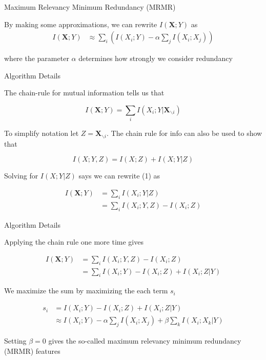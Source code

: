 \documentclass{beamer}					%
\begin{document}
\begin{frame}{Maximum Relevancy Minimum Redundancy (MRMR)}

By making some approximations, we can rewrite $I(\bm{X};Y)$ as
\begin{align*}
I(\bm{X};Y) &\approx \sum_{i} \left(I(X_{i};Y)- \alpha\sum_{j}I(X_{i};X_{j}) \right)
\end{align*}

where the parameter $\alpha$ determines how strongly we consider redundancy

\end{frame}

\begin{frame}{Algorithm Details}

The chain-rule for mutual information tells us that

\begin{equation}
I(\bm{X};Y) = \sum_{i}I(X_{i};Y|\bm{X}_{\backslash i})
\end{equation} 

To simplify notation let $Z = \bm{X}_{\backslash i}$. The chain rule for info can also be used to show that 

\begin{equation*}
I(X;Y,Z) = I(X;Z) + I(X;Y|Z)
\end{equation*}

Solving for $I(X;Y|Z)$ says we can rewrite (1) as

\begin{align*}
I(\bm{X};Y) &= \sum_{i}I(X_{i};Y|Z)\\
&= \sum_{i}I(X_{i};Y,Z) - I(X_{i};Z)
\end{align*} 

\end{frame}

\begin{frame}{Algorithm Details}

Applying the chain rule one more time gives

\begin{align*}
I(\bm{X};Y) &= \sum_{i}I(X_{i};Y,Z) - I(X_{i};Z)\\
&= \sum_{i}I(X_{i};Y)- I(X_{i};Z) + I(X_{i};Z|Y)
\end{align*} 


We maximize the sum by maximizing the each term $s_{i}$

\begin{align*}
s_{i} &= I(X_{i};Y)- I(X_{i};Z) + I(X_{i};Z|Y)\\
&\approx I(X_{i};Y)- \alpha\sum_{j}I(X_{i};X_{j}) + \beta\sum_{k}I(X_{i};X_{k}|Y)
\end{align*}

Setting $\beta=0$ gives the so-called maximum relevancy minimum redundancy (MRMR) features

\end{frame}
\end{document}
